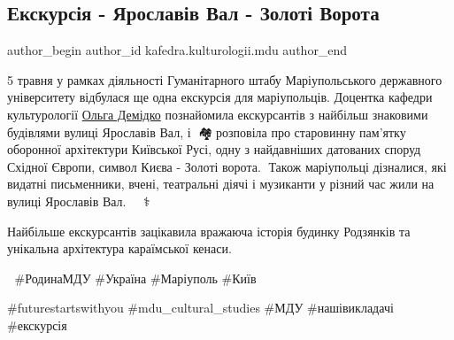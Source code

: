  
 
 
 
 

\subsection{Екскурсія - Ярославів Вал - Золоті Ворота}
\label{sec:05_05_2023.fb.kafedra.kulturologii.mdu.1.ekskursia_jaroslaviv_val_zoloti_vorota}
 
\ifcmt
 author_begin
   author_id kafedra.kulturologii.mdu
 author_end
\fi

5 травня у рамках діяльності Гуманітарного штабу Маріупольського державного
університету відбулася ще одна екскурсія для маріупольців. Доцентка кафедри
культурології \href{\urlDemidkoIA}{Ольга Демідко} познайомила екскурсантів з найбільш знаковими
будівлями вулиці Ярославів Вал, і 🏰🏘🏫розповіла про  старовинну пам'ятку
оборонної архітектури Київської Русі, одну з найдавніших датованих споруд
Східної Європи, символ Києва - Золоті ворота.🤎 Також маріупольці дізналися,
які видатні письменники, вчені, театральні діячі і музиканти у різний час жили
на вулиці Ярославів Вал.👨🔬👨🎨👩⚕️ 

Найбільше  екскурсантів зацікавила  вражаюча історія будинку Родзянків та
унікальна архітектура караїмської кенаси.

🏯  \#РодинаМДУ  \#Україна \#Маріуполь \#Київ

\#futurestartswithyou  \#mdu\_cultural\_studies \#МДУ  \#нашівикладачі \#екскурсія
